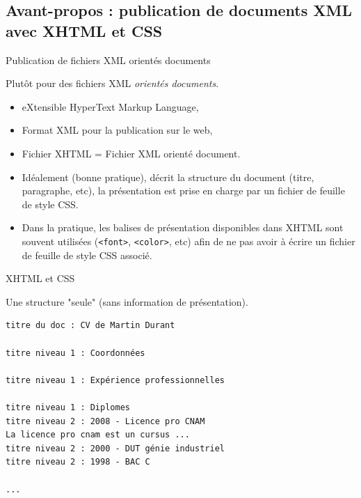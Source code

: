\subsection{Avant-propos : publication de documents XML avec XHTML et CSS}

\begin{frame}[containsverbatim]{Publication de fichiers XML orientés documents}

Plut\^ot pour des fichiers XML {\it orient\'es documents}.

\begin{itemize}
\item eXtensible HyperText Markup Language,
\item Format XML pour la publication sur le web,
\item Fichier XHTML = Fichier XML orient\'e document.
\end{itemize}

\begin{itemize}
\item Id\'ealement (bonne pratique), d\'ecrit la structure du document (titre, paragraphe, etc), la pr\'esentation est prise en charge par un fichier de feuille de style CSS.
\item Dans la pratique, les balises de pr\'esentation disponibles dans XHTML sont souvent utilis\'ees (\verb?<font>?, \verb?<color>?, etc) afin de ne pas avoir à \'ecrire un fichier de feuille de style CSS associ\'e.
\end{itemize}

\end{frame}


\begin{frame}[containsverbatim]{XHTML et CSS}

Une structure "seule" (sans information de pr\'esentation).


\begin{small}
\begin{verbatim}
titre du doc : CV de Martin Durant

titre niveau 1 : Coordonnées

titre niveau 1 : Expérience professionnelles

titre niveau 1 : Diplomes
titre niveau 2 : 2008 - Licence pro CNAM
La licence pro cnam est un cursus ...
titre niveau 2 : 2000 - DUT génie industriel
titre niveau 2 : 1998 - BAC C

...
\end{verbatim}
\end{small}
\end{frame}


